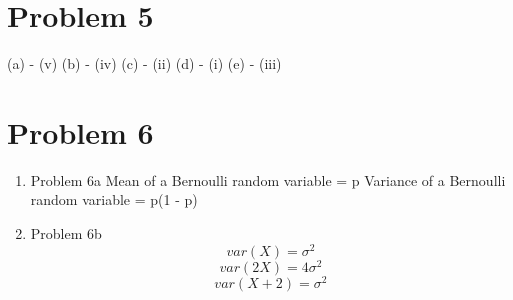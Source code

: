 \documentclass[11pt]{article}
\newcommand{\solution}[1]{{{\color{blue}{\bf Solution:} {#1}}}}
\begin{document}
\newpage

\section{Problem 5}

(a) - (v) \newline
(b) - (iv) \newline
(c) - (ii) \newline
(d) - (i) \newline
(e) - (iii) 

\newpage
\section{Problem 6}
\begin{enumerate}
\item Problem 6a \newline
\solution{}
Mean of a Bernoulli random variable = p \newline
Variance of a Bernoulli random variable = p(1 - p)

\item Problem 6b \newline
\solution{}
$$var(X) = \sigma ^ 2$$
$$var(2X) = 4 \sigma ^ 2$$
$$var(X + 2) =  \sigma ^ 2$$
\end{enumerate}

\newpage
\end{document}
